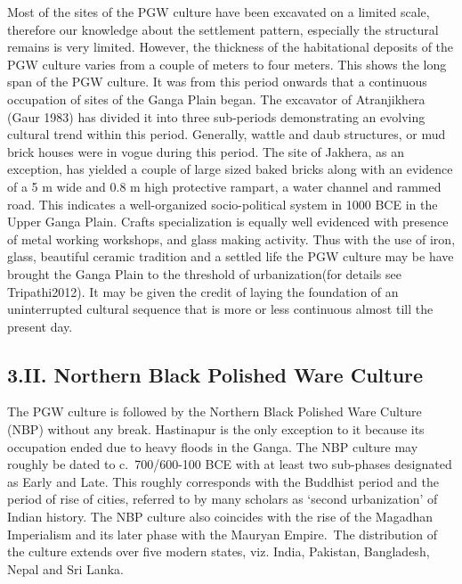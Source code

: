 Most of the sites of the PGW culture have been excavated on a limited scale, therefore our knowledge about the settlement pattern, especially the structural remains is very limited. However, the thickness of the habitational deposits of the PGW culture varies from a couple of meters to four meters. This shows the long span of the PGW culture. It was from this period onwards that a continuous occupation of sites of the Ganga Plain began. The excavator of Atranjikhera (Gaur 1983) has divided it into three sub-periods demonstrating an evolving cultural trend within this period. Generally, wattle and daub structures, or mud brick houses were in vogue during this period. The site of Jakhera, as an exception, has yielded a couple of large sized baked bricks along with an evidence of a 5 m wide and 0.8 m high protective rampart, a water channel and rammed road. This indicates a well-organized socio-political system in 1000 BCE in the Upper Ganga Plain. Crafts specialization is equally well evidenced with presence of metal working workshops, and glass making activity. Thus with the use of iron, glass, beautiful ceramic tradition and a settled life the PGW culture may be have brought the Ganga Plain to the threshold of urbanization(for details see Tripathi2012). It may be given the credit of laying the foundation of an uninterrupted cultural sequence that is more or less continuous almost till the present day.

\vspace{-.3cm}

\subsection*{3.II. Northern Black Polished Ware Culture}\label{subsection-9}

\vspace{-.2cm}

The PGW culture is followed by the Northern Black Polished Ware Culture (NBP) without any break. Hastinapur is the only exception to it because its occupation ended due to heavy floods in the Ganga. The NBP culture may roughly be dated to c.~700/600-100 BCE with at least two sub-phases designated as Early and Late. This roughly corresponds with the Buddhist period and the period of rise of cities, referred to by many scholars as `second urbanization' of Indian history. The NBP culture also coincides with the rise of the Magadhan Imperialism and its later phase with the Mauryan Empire.~The distribution of the culture extends over five modern states, viz. India, Pakistan, Bangladesh, Nepal and Sri Lanka.

